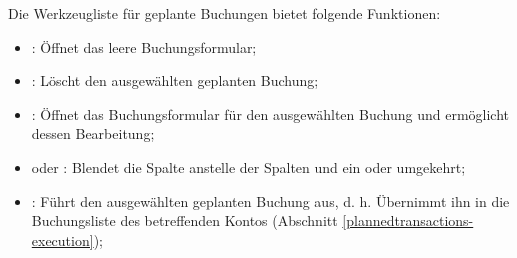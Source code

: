 Die Werkzeugliste für geplante Buchungen bietet folgende Funktionen:
\begin{itemize}
	\item {}: Öffnet das leere Buchungsformular;
	\item {}: Löscht den ausgewählten geplanten Buchung;
	\item {}: Öffnet das Buchungsformular für den ausgewählten Buchung und ermöglicht dessen Bearbeitung;
	\item {} oder : Blendet die Spalte  anstelle der Spalten  und  ein oder umgekehrt;
	\item {}: Führt den ausgewählten geplanten Buchung aus, d. h. Übernimmt ihn in die Buchungsliste des betreffenden Kontos (Abschnitt \vref{plannedtransactions-execution});

\end{itemize}

